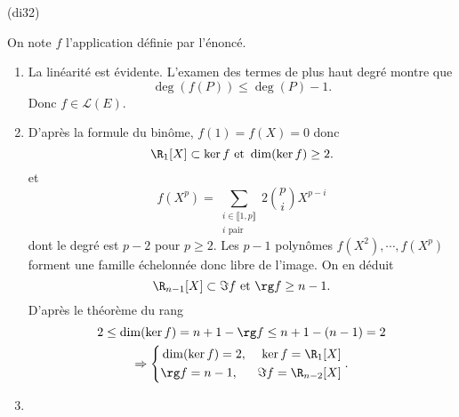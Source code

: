 \begin{tiny}(di32)\end{tiny} On note $f$ l'application définie par l'énoncé.
\begin{enumerate}
  \item La linéarité est évidente. L'examen des termes de plus haut degré montre que 
\[
  \deg(f(P)) \leq \deg(P) - 1.
\]
Donc $f \in \mathcal{L}(E)$.

  \item D'après la formule du binôme, $f(1) = f(X) = 0$ donc 
\[
  \R_1[X] \subset \ker f \text{ et } \dim(\ker f) \geq 2.
\]
et
\[
  f(X^p) = \sum_{\substack{i \in \llbracket 1, p\rrbracket\\ i \text{ pair}}} 2\binom{p}{i} X^{p-i}
\]
dont le degré est $p-2$ pour $p \geq 2$.\newline
Les $p-1$ polynômes $f(X^2), \cdots, f(X^p)$ forment une famille échelonnée donc libre de l'image. On en déduit
\[
  \R_{n-1}[X] \subset \Im f \text{ et } \rg f \geq n - 1.
\]
D'après le théorème du rang
\begin{multline*}
  2 \leq \dim(\ker f) = n+1 - \rg f  \leq n+1 -(n-1)=2 \\
  \Rightarrow 
  \left\lbrace
  \begin{aligned}
    &\dim(\ker f) = 2, & \ker f = \R_1[X] \\
    &\rg f = n-1, & \Im f = \R_{n-2}[X]
  \end{aligned} 
  \right. .
\end{multline*}

  \item 
\end{enumerate}
